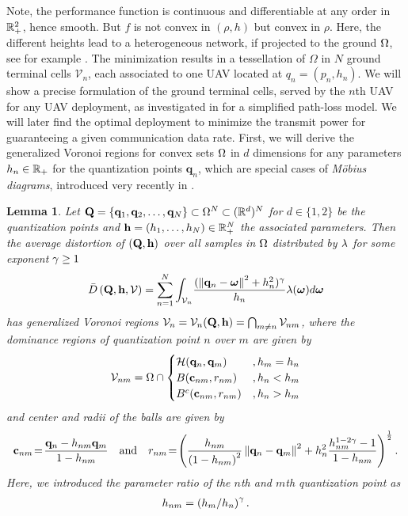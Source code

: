 \documentclass[smallabstract,smallcaptions]{dccpaper}
\newtheorem{lemma}{Lemma}
\newcounter{example}[section]
\renewcommand{\vp}{\mathbf q}
\renewcommand{\vP}{\mathbf Q}
\newcommand{\HS}{\ensuremath{\mathcal{H}}}          %
\newcommand{\df}{\ensuremath{\lam}}         %
\newcommand{\gP}{\ensuremath{\vP}}          %
\newcommand{\gp}{\ensuremath{\vp}}          %
\newcommand{\fH}{\ensuremath{\vh}}          %
\newcommand{\fh}{\ensuremath{h}}          %
\newcommand{\Vor}{\ensuremath{\mathcal{V}}}         %
\newcommand{\Dis}{\ensuremath{D}}                    %
\newcommand{\AvDis}{\ensuremath{\bar{\Dis}}}         %
\begin{document}
  Note, the performance function is continuous and differentiable at any order in ${\mathbb R}^2_+$, hence smooth. But $f$ is not
  convex in $(\rho,h)$ but convex in $\rho$. 
  Here, the different heights lead to a heterogeneous network, if projected to the ground $\Omega$, see for example
  \cite{GJ16a}.  The minimization results in a tessellation of $\Omega$ in $N$ ground terminal cells $\Vor_n$, each
  associated to one UAV located at $q_n=(p_n,h_n)$.  We will show a precise formulation of the ground terminal cells,
  served by the $n$th UAV for any UAV deployment, as investigated in \cite{MSBD16b} for a simplified path-loss model. We
  will later find the optimal deployment to minimize the transmit power for guaranteeing a given communication data rate.
  \fi
%
First, we will derive the generalized Voronoi regions for convex sets $\Omega$ in $d$ dimensions for any parameters
$h_n\in{\ensuremath{\mathbb R}}_+$  for the quantization points $\vp_n$, which are special cases of \emph{M{\"o}bius diagrams},
introduced very recently in \cite{BWY07}. 
%
\begin{lemma}\label{lem:moebiusdia}
  Let $\vP=\{\gp_1,\gp_2,\dots, \gp_N\}\subset \Omega^N\subset (\R^d)^N$ for $d\in\{1,2\}$ be the quantization points 
  and $\fH=(\fh_1,\dots,\fh_N)\in\R_+^N$  the associated parameters. Then the average distortion of $(\vP,\vh)$ 
  over all samples in $\Omega$ distributed by $\df$ for  some exponent $\gamma\geq1$ 
  \begin{align}
    \AvDis\left(\vP,\fH, \Vor\right) 
    = \sum_{n=1}^{N} \int_{\Vor_n} \! \frac{ (\Norm{\gp_n- \vome}^2 +h_n^2)^{\gam}}{h_n} \df(\vome)d\vome
       \label{eq:minimizationmoebius}
  \end{align}
  has generalized Voronoi regions $\Vor_n= \Vor_{n}(\gP,\fH)= \bigcap_{m\not=n} \Vor_{nm}$, 
  where the dominance regions of quantization point $n$ over $m$ are given by
  \begin{align}
    \Vor_{nm}=\Omega\cap\begin{cases}
         \HS(\gp_n,\gp_m)&, h_m=h_n \\
         B(\vc_{nm},r_{nm}) &, h_n<h_m\\
         B^c(\vc_{nm},r_{nm}) &, h_n>h_m 
        \end{cases}\label{eq:moebius}
  \end{align}
  and center and radii of the balls are given by
  \begin{align}
    \vc_{nm}\!=\!\frac{\gp_n - h_{nm}\gp_m}{1-h_{nm}}
    \quad\text{and}\quad 
    r_{nm}\!=\!\left(\frac{h_{nm}}{\left(1-h_{nm}\right)^2}\Norm{\gp_n-\gp_m}^2  + h_n^2 \frac{h_{nm}^{1-2\gam}
  -1}{1-h_{nm}}\right)^{\frac{1}{2}}.
  \label{eq:rnmcnm}
  \end{align}
  Here, we introduced the parameter ratio of the $n$th and $m$th quantization point as
  \begin{align}
    h_{nm}= \left(h_m/h_n\right)^{\gamma}.
  \end{align}
\end{lemma}
\end{document}
